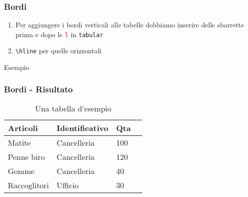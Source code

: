 \begin{frame}[fragile]
 
  \frametitle{Bordi}
  
  \begin{enumerate}
   \item Per aggiungere i bordi verticali alle tabelle dobbiamo inserire 
delle sbarrette prima e dopo le \texttt{\textcolor{red}{l}} in \texttt{tabular}
   \item \texttt{\textbackslash hline} per quelle orizzontali
  \end{enumerate}
  \begin{exampleblock}{Esempio}
    
  \end{exampleblock}
\end{frame}

\begin{frame}
 
 \frametitle{Bordi - Risultato}
 
 \begin{table}[h!]
\centering
\begin{tabular}{|l|l|l|l|}
\hline
Articoli      & Identificativo & Qta \\ \hline
Matite        & Cancelleria    & 100 \\ \hline
Penne biro    & Cancelleria    & 120 \\ \hline
Gomme         & Cancelleria    & 40  \\ \hline
Raccoglitori  & Ufficio        & 30  \\ \hline
\end{tabular}
\caption{Una tabella d'esempio}
\end{table}

\end{frame}

